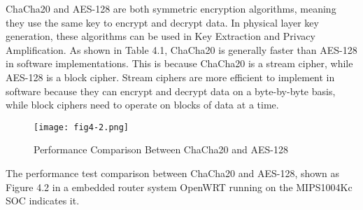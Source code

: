 ChaCha20 and AES-128 are both symmetric encryption algorithms, meaning they use the same key to encrypt and decrypt data. In physical layer key generation, these algorithms can be used in Key Extraction and Privacy Amplification. As shown in Table 4.1, ChaCha20 is generally faster than AES-128 in software implementations. This is because ChaCha20 is a stream cipher, while AES-128 is a block cipher. Stream ciphers are more efficient to implement in software because they can encrypt and decrypt data on a byte-by-byte basis, while block ciphers need to operate on blocks of data at a time.
\begin{figure}
    \centering
    \texttt{[image: fig4-2.png]}
    \caption{Performance Comparison Between ChaCha20 and AES-128}
    \label{fig:4-2}
\end{figure}
The performance test comparison between ChaCha20 and AES-128, shown as Figure 4.2 in a embedded router system OpenWRT running on the MIPS1004Kc SOC indicates it.